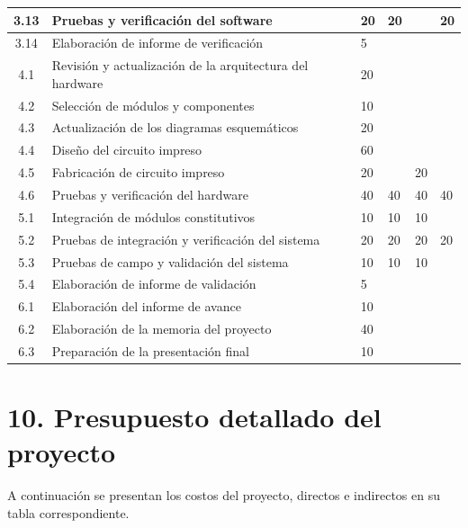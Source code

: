 \documentclass[11pt]{charter}
\begin{document}
\begin{table}[!htpb]
\begin{center}
\begin{tabularx}{\linewidth}{@{}|c|X|m{0.8cm}|m{1.4cm}|m{1.3cm}|m{1.1cm}|@{}}
  3.13 & Pruebas y verificación del software & 20 & 20 & & 20 \\ \hline
  3.14 & Elaboración de informe de verificación & 5 & & & \\ \hline
  4.1 & Revisión y actualización de la arquitectura del hardware & 20 & & & \\ \hline
  4.2 & Selección de módulos y componentes & 10 & & & \\ \hline
  4.3 & Actualización de los diagramas esquemáticos & 20 & & & \\  \hline
  4.4 & Diseño del circuito impreso & 60 & & & \\ \hline
  4.5 & Fabricación de circuito impreso & 20 & & 20 & \\  \hline
  4.6 & Pruebas y verificación del hardware & 40 & 40 & 40 & 40 \\ \hline
  5.1 & Integración de módulos constitutivos & 10 & 10 & 10 & \\ \hline
  5.2 & Pruebas de integración y verificación del sistema & 20 & 20 & 20 & 20 \\ \hline
  5.3 & Pruebas de campo y validación del sistema & 10 & 10 & 10 & \\ \hline
  5.4 & Elaboración de informe de validación & 5 & & & \\ \hline
  6.1 & Elaboración del informe de avance & 10 & & & \\ \hline
  6.2 & Elaboración de la memoria del proyecto & 40 & & & \\ \hline
  6.3 & Preparación de la presentación final & 10 & & & \\ \hline
  \end{tabularx}
\end{center}
\label{tab:recursos}
\end{table}

\newpage

\section{10. Presupuesto detallado del proyecto}
\label{sec:presupuesto}

A continuación se presentan los costos del proyecto, directos e indirectos en su 
tabla correspondiente.
\end{document}
